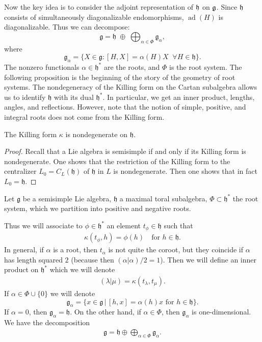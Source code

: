 \documentclass[12pt]{article}
\begin{document}
Now the key idea is to consider the adjoint representation of $\mathfrak{h}$ on $\mathfrak{g}$. Since $\mathfrak{h}$ consists of simultaneously diagonalizable endomorphisms, $\operatorname{ad}(H)$ is diagonalizable. Thus we can decompose:
\[
    \mathfrak{g} = \mathfrak{h} \;\oplus\; \bigoplus_{\alpha \in \Phi} \mathfrak{g}_\alpha,
\]
where
\[
    \mathfrak{g}_\alpha = \{ X \in \mathfrak{g} : [H,X] = \alpha(H) X \;\;\forall H\in \mathfrak{h}\}.
\]
The nonzero functionals $\alpha \in \mathfrak{h}^*$ are the roots, and $\Phi$ is the root system. The following proposition is the beginning of the story of the geometry of root systems. The nondegeneracy of the Killing form on the Cartan subalgebra allows us to identify $\mathfrak{h}$ with its dual $\mathfrak{h}^*$. In particular, we get an inner product, lengths, angles, and reflections. However, note that the notion of simple, positive, and integral roots does not come from the Killing form.

\begin{proposition}[Humphreys 8.2]
    The Killing form $\kappa$ is nondegenerate on $\mathfrak{h}$.
\end{proposition}

\begin{proof}

    Recall that a Lie algebra is semisimple if and only if its Killing form is nondegenerate. One shows that the restriction of the Killing form to the centralizer $L_0 = C_L(\mathfrak{h})$ of $\mathfrak{h}$ in $L$ is nondegenerate. Then one shows that in fact $L_0 = \mathfrak{h}$.
\end{proof}

Let $\mathfrak{g}$ be a semisimple Lie algebra, $\mathfrak{h}$ a maximal toral subalgebra, $\Phi \subset \mathfrak{h}^*$ the root system, which we partition into positive and negative roots.

Thus we will associate to $\phi \in \mathfrak{h}^*$ an element $t_\phi \in \mathfrak{h}$ such that
\begin{align*}
    \kappa(t_\phi, h) = \phi(h) \quad \text{for } h \in \mathfrak{h}.
\end{align*}
In general, if $\alpha$ is a root, then $t_\alpha$ is not quite the coroot, but they coincide if $\alpha$ has length squared $2$ (because then $(\alpha|\alpha)/2 = 1$).
Then we will define an inner product on $\mathfrak{h}^*$ which we will denote
\begin{align*}
    (\lambda | \mu) = \kappa(t_\lambda, t_\mu).
\end{align*}
If $\alpha \in \Phi \cup \{0\}$ we will denote
\[
    \mathfrak{g}_\alpha = \{x \in \mathfrak{g} \,|\, [h,x] = \alpha(h)x \text{ for } h \in \mathfrak{h} \}.
\]
If $\alpha = 0$, then $\mathfrak{g}_\alpha = \mathfrak{h}$. On the other hand, if $\alpha \in \Phi$, then $\mathfrak{g}_\alpha$ is one-dimensional. We have the decomposition
\begin{align*}
    \mathfrak{g} = \mathfrak{h} \oplus \bigoplus_{\alpha \in \Phi} \mathfrak{g}_\alpha.
\end{align*}
\end{document}
